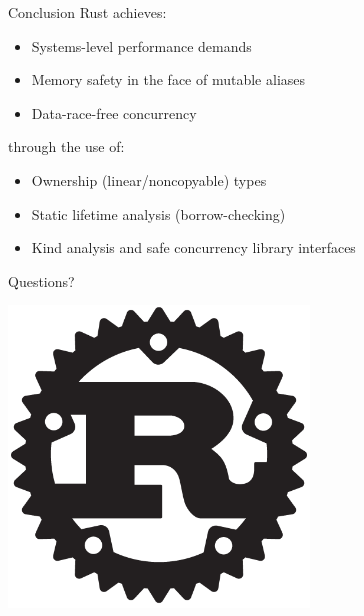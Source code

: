 \documentclass[xcolor=dvipsnames]{beamer}
\begin{document}
\begin{frame}{Conclusion}
	Rust achieves:
	\begin{itemize}
		\item Systems-level performance demands
		\item Memory safety in the face of mutable aliases
		\item Data-race-free concurrency
	\end{itemize}
	\linegap

	through the use of:
	\begin{itemize}
		\item Ownership (linear/noncopyable) types
		\item Static lifetime analysis (borrow-checking)
		\item Kind analysis and safe concurrency library interfaces
	\end{itemize}
\end{frame}

\begin{frame}{Questions?}
	\begin{center}
		\includegraphics[width=0.6\textwidth]{rust.png}
	\end{center}
\end{frame}
\end{document}

